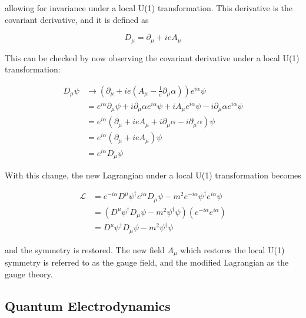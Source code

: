 \documentclass[12pt,a4paper,epsf,portrait,times,epsfig]{report}
\begin{document}
	allowing for invariance under a local U(1) transformation. This derivative is the covariant derivative, and it is defined as

	\begin{equation}
		D_{\mu} = \partial_{\mu} + ieA_{\mu}
	\end{equation}

	This can be checked by now observing the covariant derivative under a local U(1) transformation:

	\begin{equation}
		\begin{split}
			D_{\mu}\psi &\rightarrow (\partial_{\mu}+ie(A_{\mu}-\frac{1}{e}\partial_{\mu}\alpha))e^{i\alpha}\psi \\
			&= e^{i\alpha}\partial_{\mu}\psi + i\partial_{\mu}\alpha e^{i \alpha}\psi + iA_{\mu}e^{i\alpha}\psi - i\partial_{\mu}\alpha e^{i\alpha}\psi \\
			&= e^{i\alpha}(\partial_{\mu} + ieA_{\mu} + i\partial_{\mu}\alpha - i\partial_{\mu}\alpha)\psi \\
			&= e^{i\alpha}(\partial_{\mu}+ieA_{\mu})\psi \\
			&= e^{i\alpha}D_{\mu}\psi
		\end{split}
	\end{equation}

	With this change, the new Lagrangian under a local U(1) transformation becomes

	\begin{equation}
		\begin{split}
			\mathcal{L} &= e^{-i\alpha}D^{\mu}\psi^{\dagger}e^{i\alpha}D_{\mu}\psi - m^{2}e^{-i\alpha}\psi^{\dagger}e^{i\alpha}\psi \\
			&= (D^{\mu}\psi^{\dagger}D_{\mu}\psi - m^{2}\psi^{\dagger}\psi)(e^{-i\alpha}e^{i\alpha}) \\
			&= D^{\mu}\psi^{\dagger}D_{\mu}\psi - m^{2}\psi^{\dagger}\psi
		\end{split}
	\end{equation}


	and the symmetry is restored. The new field $A_{\mu}$ which restores the local U(1) symmetry is referred to as the gauge field, and the modified Lagrangian as the gauge theory. \par



	\subsection{Quantum Electrodynamics} \label{Section:QED}
\end{document}
